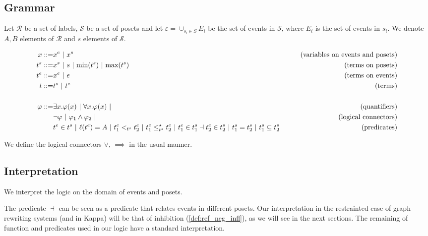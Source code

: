 \subsection{Grammar}

Let $\mathcal{R}$ be a set of labels, $\mathcal{S}$ be a set of posets and let $\varepsilon = \cup_{s_i\in S} E_i$ be the set of events in $\mathcal{S}$, where $E_i$ is the set of events in $s_i$.
We denote $A,B$ elements of $\mathcal{R}$ and $s$ elements of $\mathcal{S}$.

\begin{align*}
  x ::= & x^e ~|~ x^s & \tag{variables on events and posets} \\
  t^s ::= & x^s ~|~ s ~|~ \text{min}(t^s) ~|~ \text{max}(t^s) &\tag{terms on posets} \\
  t^e ::= & x^e ~|~ e & \tag{terms on events}\\
  t ::= & t^s ~|~ t^e & \tag{terms}\\
  \\
  \varphi ::= & \exists x.\varphi(x) ~|~ \forall x.\varphi(x) ~|&\tag{quantifiers}\\
  & \neg \varphi ~|~\varphi_1 \wedge \varphi_2~|&\tag{logical connectors}\\
  & t^e\in t^s ~|~ \ell(t^e) = A ~|~ t^e_1 <_{t^s} t^e_2 ~|~ t^e_1 \leq^{\star}_{t^s} t^e_2 ~|~ t^e_1\in t^s_1 \dashv t^e_2\in t^s_2~|~ t^s_1 = t^s_2 ~|~ t^s_1\subseteq t^s_2
  & \tag{predicates}\\
\end{align*}

We define the logical connectors $\vee$, $\implies$ in the usual manner.

\subsection{Interpretation}

We interpret the logic on the domain of events and posets.


The predicate $\dashv$ can be seen as a predicate that relates events in different posets. Our interpretation in the restrainted case of graph rewriting systems (and in Kappa) will be that of inhibition (\autoref{def:ref_neg_infl}), as we will see in the next sections. The remaining of function and predicates used in our logic have a standard interpretation.

